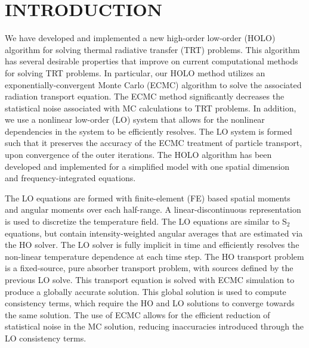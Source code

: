 %
%
%



\pagestyle{plain} %
\setcounter{page}{1}

\chapter{\uppercase {Introduction}}

We have developed and implemented a new high-order low-order (HOLO) algorithm for solving
thermal radiative transfer (TRT) problems. This algorithm has several desirable properties
that improve on current computational methods for solving TRT
problems.  In particular, our HOLO method utilizes an exponentially-convergent Monte
Carlo (ECMC) algorithm to solve the associated radiation transport equation.  The ECMC
method significantly decreases the statistical noise associated with MC calculations to
TRT problems.  In addition, we use a nonlinear low-order (LO) system that allows for the
nonlinear dependencies in the system to be efficiently resolves.  The LO system is formed
such that it preserves the accuracy of the ECMC
treatment of particle transport, upon convergence of the outer iterations.  The HOLO algorithm has
been developed and implemented for a simplified model with one spatial dimension and 
frequency-integrated equations.

The LO equations are formed with finite-element (FE) based spatial
moments and angular moments over each half-range.  A linear-discontinuous representation
is used to discretize the temperature field.  The LO equations are similar to S$_2$ equations,
but contain intensity-weighted angular averages that are estimated via the HO solver.    
The LO solver is fully implicit in time and efficiently resolves the non-linear
temperature dependence at each time step.  The HO transport problem is a fixed-source,
pure absorber transport problem, with sources defined by the previous LO solve.  This
transport equation is solved with ECMC simulation to produce a globally accurate solution. 
This
global solution is used to compute consistency terms, which require the HO and LO solutions to converge towards the same solution.  The use of ECMC
allows for the efficient reduction of statistical noise in the MC solution, reducing
inaccuracies introduced through the LO consistency
terms. 

